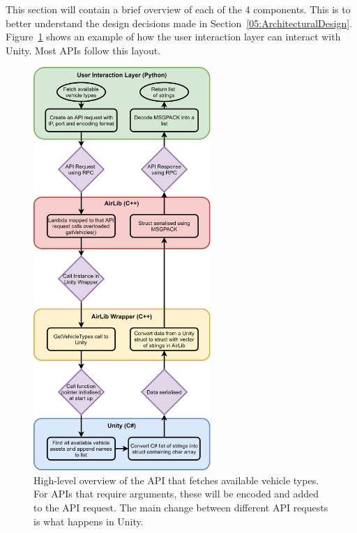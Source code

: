 This section will contain a brief overview of each of the 4 components. This is to better understand the design decisions made in Section~\ref{05:ArchitecturalDesign}. Figure~\ref{05:stringList} shows an example of how the user interaction layer can interact with Unity. Most APIs follow this layout.



\begin{figure}[p]
    \centering
    \includegraphics[width=0.6\textwidth]{05_AnalysisAndDesign/Diagrams/stringArray.png}
    \caption{High-level overview of the API that fetches available vehicle types. For APIs that require arguments, these will be encoded and added to the API request. The main change between different API requests is what happens in Unity.} \label{05:stringList}
\end{figure}

